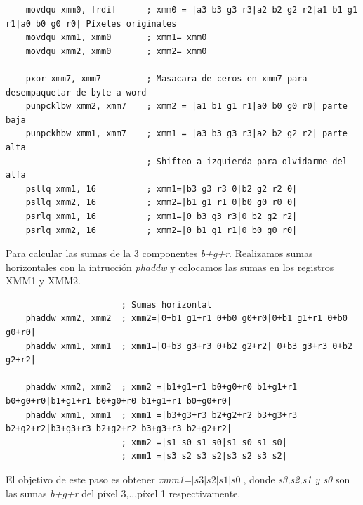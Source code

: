 \begin{codesnippet}
\begin{verbatim}
    movdqu xmm0, [rdi]      ; xmm0 = |a3 b3 g3 r3|a2 b2 g2 r2|a1 b1 g1 r1|a0 b0 g0 r0| Píxeles originales
    movdqu xmm1, xmm0       ; xmm1= xmm0
    movdqu xmm2, xmm0       ; xmm2= xmm0

    pxor xmm7, xmm7         ; Masacara de ceros en xmm7 para desempaquetar de byte a word
    punpcklbw xmm2, xmm7    ; xmm2 = |a1 b1 g1 r1|a0 b0 g0 r0| parte baja
    punpckhbw xmm1, xmm7    ; xmm1 = |a3 b3 g3 r3|a2 b2 g2 r2| parte alta
                            ; Shifteo a izquierda para olvidarme del alfa
    psllq xmm1, 16          ; xmm1=|b3 g3 r3 0|b2 g2 r2 0|
    psllq xmm2, 16          ; xmm2=|b1 g1 r1 0|b0 g0 r0 0|
    psrlq xmm1, 16          ; xmm1=|0 b3 g3 r3|0 b2 g2 r2|
    psrlq xmm2, 16          ; xmm2=|0 b1 g1 r1|0 b0 g0 r0|
\end{verbatim}
\end{codesnippet}

Para calcular las sumas de la 3 componentes \emph{b+g+r}. Realizamos sumas horizontales con la intrucción \emph{phaddw} y colocamos las sumas en los registros XMM1 y XMM2.

\begin{codesnippet}
\begin{verbatim}
                       ; Sumas horizontal
    phaddw xmm2, xmm2  ; xmm2=|0+b1 g1+r1 0+b0 g0+r0|0+b1 g1+r1 0+b0 g0+r0|
    phaddw xmm1, xmm1  ; xmm1=|0+b3 g3+r3 0+b2 g2+r2| 0+b3 g3+r3 0+b2 g2+r2|

    phaddw xmm2, xmm2  ; xmm2 =|b1+g1+r1 b0+g0+r0 b1+g1+r1 b0+g0+r0|b1+g1+r1 b0+g0+r0 b1+g1+r1 b0+g0+r0|
    phaddw xmm1, xmm1  ; xmm1 =|b3+g3+r3 b2+g2+r2 b3+g3+r3 b2+g2+r2|b3+g3+r3 b2+g2+r2 b3+g3+r3 b2+g2+r2|
                       ; xmm2 =|s1 s0 s1 s0|s1 s0 s1 s0|
                       ; xmm1 =|s3 s2 s3 s2|s3 s2 s3 s2|
\end{verbatim}
\end{codesnippet}

El objetivo de este paso es obtener \emph{xmm1=$|s3|s2|s1|s0|$}, donde \emph{s3,s2,s1 y s0} son las sumas \emph{b+g+r} del píxel 3,..,píxel 1 respectivamente.

